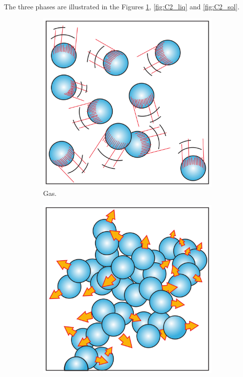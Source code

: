 The three phases are illustrated in the Figures \ref{fig:C2_gas}, \ref{fig:C2_liq} and  \ref{fig:C2_sol}.

\begin{figure}[h]
     \centering
     \begin{subfigure}[b]{0.3\textwidth}
         \centering
         \includegraphics[width=\textwidth]{Chapitre_2/Images/gas.png}
         \caption{Gas.}
         \label{fig:C2_gas}
     \end{subfigure}
     \begin{subfigure}[b]{0.3\textwidth}
         \centering
         \includegraphics[width=\textwidth]{Chapitre_2/Images/liquid.png}

\end{subfigure}
\end{figure}
